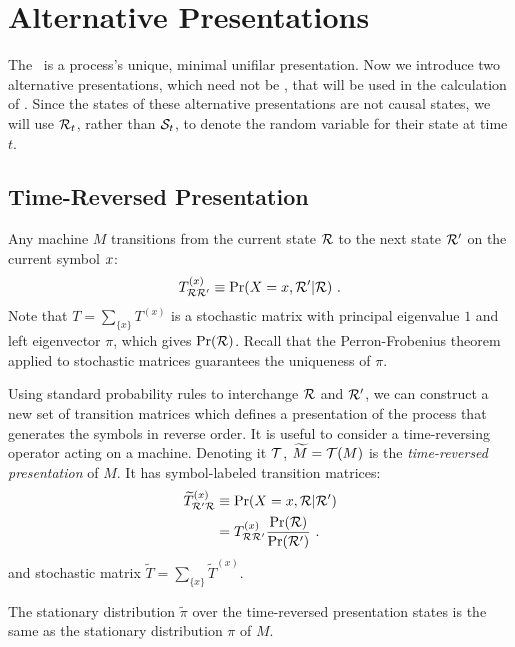 \section{Alternative Presentations}

The \eM\ is a process's unique, minimal unifilar presentation. Now we introduce
two alternative presentations, which need not be \eMs, that will be used in
the calculation of \EE.  Since the states of these alternative presentations
are not causal states, we will use $\mathcal{R}_t$, rather than 
$\mathcal{S}_t$, to denote the random variable for their state at time $t$.

\subsection{Time-Reversed Presentation}

Any machine $M$ transitions from the current state $\mathcal{R}$ to the
next state ${\cal R}^{\prime}$ on the current symbol ${x}$:
\begin{equation}
T^{(x)}_{\mathcal{R}{\cal R}^{\prime}} 
  \equiv 
  \Pr({X}={x}, {\cal R}^{\prime} | \mathcal{R}) ~.
\end{equation}
Note that $T = \sum_{\{x\}} T^{(x)}$ is a stochastic matrix with principal
eigenvalue $1$ and left eigenvector $\pi$, which gives $\Pr(\mathcal{R})$.
Recall that the Perron-Frobenius theorem applied to stochastic matrices
guarantees the uniqueness of $\pi$.

Using standard probability rules to interchange $\mathcal{R}$ and 
${\cal R}^{\prime}$, we can construct a new set of transition matrices
which defines a presentation of the process that generates the symbols in 
reverse order. It is useful to consider a time-reversing operator acting on a
machine. Denoting it $\mathcal{T}$, $\widetilde{M} = \mathcal{T}(M)$ is the
\emph{time-reversed presentation} of $M$. It has symbol-labeled
transition matrices:
\begin{align}
\widetilde{T}^{(x)}_{{\cal R}^{\prime}\mathcal{R}}
  & \equiv
\Pr({X}={x}, \mathcal{R} | {\cal R}^{\prime})
\nonumber \\
  & = 
T^{(x)}_{\mathcal{R}{\cal R}^{\prime}} 
    \frac{ \Pr(\mathcal{R}) }{ \Pr({\cal R}^{\prime}) } ~.
\end{align}
and stochastic matrix $\widetilde{T} = \sum_{\{x\}} \widetilde{T}^{(x)}$.

\begin{Prop}
\label{eqpi}
The stationary distribution $\widetilde{\pi}$ over the time-reversed
presentation states is the same as the stationary distribution $\pi$ of $M$.
\end{Prop}

